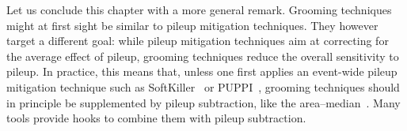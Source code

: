 \vspace{0.5cm}


Let us conclude this chapter with a more general remark.
Grooming techniques
might at first sight be similar to pileup mitigation techniques. They
however target a different goal: while pileup mitigation techniques
aim at correcting for the average effect of pileup, grooming
techniques reduce the overall sensitivity to pileup.
%
In practice, this means that, unless one first applies an event-wide
pileup mitigation technique such as
SoftKiller~\cite{Cacciari:2014gra} or PUPPI~\cite{Bertolini:2014bba},
grooming techniques should in principle be supplemented by pileup
subtraction, like the
area--median~\cite{Cacciari:2007fd,Cacciari:2008gn,AlcarazMaestre:2012vp,Soyez:2012hv}. 
Many tools provide hooks to combine them with pileup subtraction.



